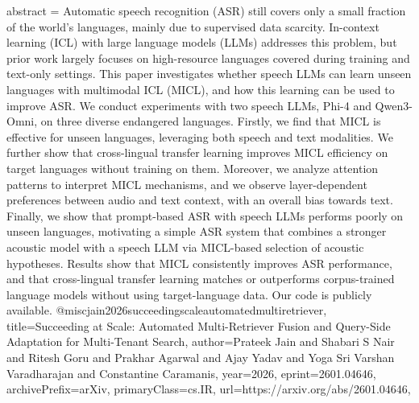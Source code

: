 {      abstract = {Automatic speech recognition (ASR) still covers only a small fraction of the world's languages, mainly due to supervised data scarcity. In-context learning (ICL) with large language models (LLMs) addresses this problem, but prior work largely focuses on high-resource languages covered during training and text-only settings. This paper investigates whether speech LLMs can learn unseen languages with multimodal ICL (MICL), and how this learning can be used to improve ASR. We conduct experiments with two speech LLMs, Phi-4 and Qwen3-Omni, on three diverse endangered languages. Firstly, we find that MICL is effective for unseen languages, leveraging both speech and text modalities. We further show that cross-lingual transfer learning improves MICL efficiency on target languages without training on them. Moreover, we analyze attention patterns to interpret MICL mechanisms, and we observe layer-dependent preferences between audio and text context, with an overall bias towards text. Finally, we show that prompt-based ASR with speech LLMs performs poorly on unseen languages, motivating a simple ASR system that combines a stronger acoustic model with a speech LLM via MICL-based selection of acoustic hypotheses. Results show that MICL consistently improves ASR performance, and that cross-lingual transfer learning matches or outperforms corpus-trained language models without using target-language data. Our code is publicly available.}
}@misc{jain2026succeedingscaleautomatedmultiretriever,
      title={Succeeding at Scale: Automated Multi-Retriever Fusion and Query-Side Adaptation for Multi-Tenant Search}, 
      author={Prateek Jain and Shabari S Nair and Ritesh Goru and Prakhar Agarwal and Ajay Yadav and Yoga Sri Varshan Varadharajan and Constantine Caramanis},
      year={2026},
      eprint={2601.04646},
      archivePrefix={arXiv},
      primaryClass={cs.IR},
      url={https://arxiv.org/abs/2601.04646},
}
